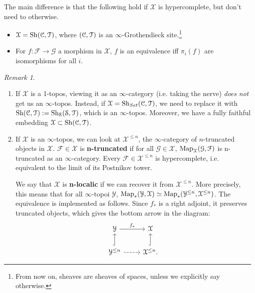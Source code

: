 \documentclass[10pt,a4paper,reqno,oneside]{book} %
\theoremstyle{plain}
\theoremstyle{definition}
\theoremstyle{remark}
\newtheorem{rem}[thm]{Remark}
\numberwithin{equation}{section}
\begin{document}
The main difference is that the following hold if $\mathcal{X}$ is hypercomplete, but don't need to otherwise.
\begin{itemize}
\item $\mathcal{X} = \mathrm{Sh}(\mathcal C, \mathcal T)$, where $(\mathcal C, \mathcal T)$ is an $\infty$-Grothendieck site.\footnote{From now on,
sheaves are sheaves of spaces, unless we explicitly say otherwise.}
\item For $f: \mathcal{F} \to \mathcal{G}$ a morphism in $\mathcal{X}$, $f$ is an equivalence
iff $\pi_i(f)$ are isomorphisms for all $i$.
\end{itemize}

\begin{rem}
\begin{enumerate}
\item If $\mathcal{X}$ is a 1-topos, viewing it as an $\infty$-category (i.e. taking the nerve) \emph{does not} get us
an $\infty$-topos. Instead, if $\mathcal{X} = \mathrm{Sh}_{Set}(\mathcal C, \mathcal T)$, we need to replace it with $\mathrm{Sh}(\mathcal C,\mathcal T) :=\mathrm{Sh}_{\mathcal S}(\mathcal S,\mathcal T)$,
which is an $\infty$-topos. Moreover, we have a fully faithful embedding $\mathcal{X} \subset \mathrm{Sh}(\mathcal C,\mathcal T)$.

\item If $\mathcal{X}$ is an $\infty$-topos, we can look at $\mathcal{X}^{\leq n}$, the $\infty$-category of $n$-truncated 
objects in $\mathcal{X}$. $\mathcal{F} \in \mathcal{X}$
is \textbf{n-truncated} if for all $\mathcal{G} \in \mathcal{X}$, $\operatorname{Map}_{\mathcal{X}}(\mathcal{G},\mathcal{F})$ is n-truncated
as an $\infty$-category. Every $\mathcal{F} \in \mathcal{X}^{\leq n}$ is hypercomplete, i.e. equivalent to the limit of its
Postnikov tower.

We say that $\mathcal{X}$ is \textbf{n-localic} if we can recover it from $\mathcal{X}^{\leq n}$. More precisely, this means that
for all $\infty$-topoi $\mathcal{Y}$, $\operatorname{Map}_*(\mathcal{Y}, \mathcal{X}) \simeq \operatorname{Map}_*(\mathcal{Y}^{\leq n}, \mathcal{X}^{\leq n})$.
The equivalence is implemented as follows. Since $f_*$ is a right adjoint, it preserves truncated objects, which gives the
bottom arrow in the diagram:
\[
\begin{tikzcd}
\mathcal{Y}\arrow{r}{f_*} & \mathcal{X} \\
\mathcal{Y}^{\leq n}\arrow[hook]{u}\arrow[dashed]{r} & \mathcal{X}^{\leq n}\arrow[hook]{u}.
\end{tikzcd}
\]


\end{enumerate}
\end{rem}
\end{document}
